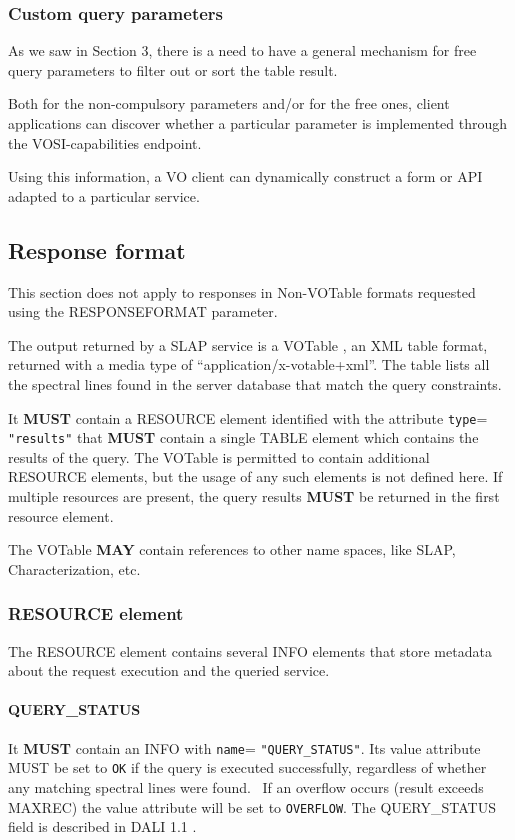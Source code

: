\documentclass[11pt,a4paper]{ivoa}
\def\attrval#1#2{\texttt{#1}\discretionary{}{}{}=\discretionary{}{}{}%
  \texttt{"#2"}}
\begin{document}
\subsubsection{Custom query parameters}

As we saw in Section 3, there is a need to have a general mechanism for
free query parameters to filter out or sort the table result.

Both for the non-compulsory parameters and/or for the free ones, client
applications can discover whether a particular parameter is implemented
through the VOSI-capabilities endpoint.

Using this information, a VO client can dynamically
construct a form or API adapted to a particular service.

\subsection{Response format}
\label{sect:lines-response-format}

This section does not apply to responses in Non-VOTable formats
requested using the RESPONSEFORMAT parameter.

The output returned by a SLAP service is a VOTable
\citep{2013ivoa.spec.0920O}, an XML table format, returned with a
media type of ``application/x-votable+xml''.
The table lists all the spectral lines found in the server database that
match the query constraints.

It \textbf{MUST} contain a RESOURCE element identified with the attribute
\attrval{type}{results} that \textbf{MUST} contain
a single TABLE element which contains the results of the query. The
VOTable is permitted to contain additional RESOURCE elements, but the
usage of any such elements is not defined here. If multiple resources
are present, the query results \textbf{MUST} be returned in the
first resource element.

The VOTable \textbf{MAY} contain references to other name spaces, like
SLAP, Characterization, etc.

\subsubsection[RESOURCE element]{RESOURCE element}
\label{sect:resource-element}

The RESOURCE element contains several INFO elements that store metadata
about the request execution and the queried service.

\paragraph{QUERY\_STATUS}\label{par:QUERY_STATUS}
It \textbf{MUST} contain an INFO with
\attrval{name}{QUERY\_STATUS}. Its value attribute
MUST be set to \texttt{OK} if the query is executed successfully,
regardless of whether any matching spectral lines were found. \ If an
overflow occurs (result exceeds MAXREC) the value attribute will be set
to \texttt{OVERFLOW}. The QUERY\_STATUS field is described
in DALI 1.1 \citep{2017ivoa.spec.0517D}.
\end{document}
